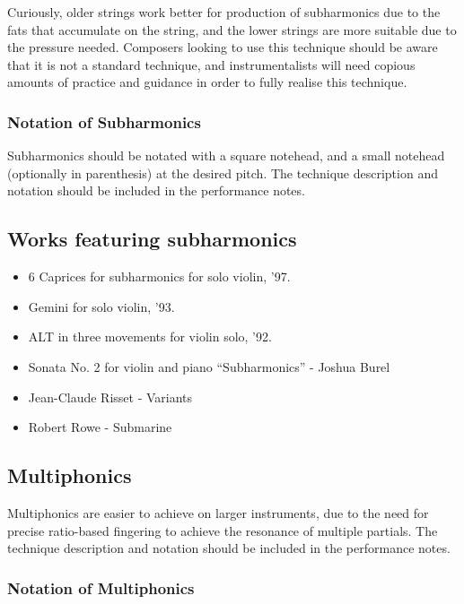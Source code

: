     Curiously, older strings work better for production of subharmonics due to the fats that accumulate on the string, and the lower strings are more suitable due to the pressure needed.\autocite{kimuraHowProduceSubharmonics1999}
Composers looking to use this technique should be aware that it is not a standard technique, and instrumentalists will need copious amounts of practice and guidance in order to fully realise this technique.

\subsubsection{Notation of Subharmonics}
Subharmonics should be notated with a square notehead, and a small notehead (optionally in parenthesis) at the desired pitch.
The technique description and notation should be included in the performance notes.

\subsection{Works featuring subharmonics }\label{sec:subharmonicsLiterature}

\begin{itemize}
    \item 6 Caprices for subharmonics for solo violin, '97.
    \item Gemini for solo violin, '93.
    \item ALT in three movements for violin solo, '92.
    \item Sonata No. 2 for violin and piano “Subharmonics” - Joshua Burel
    \item Jean-Claude Risset - Variants
    \item Robert Rowe - Submarine
\end{itemize}

\subsection{Multiphonics} \label{sec:multiphonics}
Multiphonics are easier to achieve on larger instruments, due to the need for precise ratio-based fingering to achieve the resonance of multiple partials.
The technique description and notation should be included in the performance notes.
\lipsum[4]

\subsubsection{Notation of Multiphonics}

